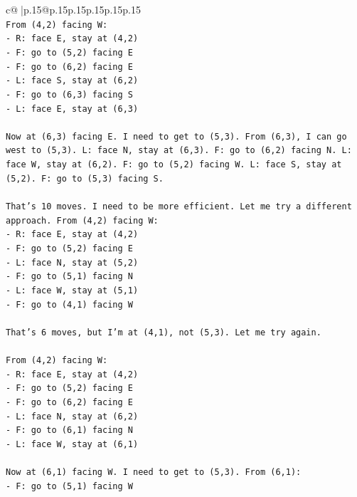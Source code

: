 \documentclass{article}
\begin{document}
{\begin{supertabular}{c@{$\;$}|p{.15\linewidth}@{}p{.15\linewidth}p{.15\linewidth}p{.15\linewidth}p{.15\linewidth}p{.15\linewidth}}
{{{\\ 
\texttt{From (4,2) facing W:} \\
\texttt{{-} R: face E, stay at (4,2)} \\
\texttt{{-} F: go to (5,2) facing E} \\
\texttt{{-} F: go to (6,2) facing E} \\
\texttt{{-} L: face S, stay at (6,2)} \\
\texttt{{-} F: go to (6,3) facing S} \\
\texttt{{-} L: face E, stay at (6,3)} \\
\\ 
\texttt{Now at (6,3) facing E. I need to get to (5,3). From (6,3), I can go west to (5,3). L: face N, stay at (6,3). F: go to (6,2) facing N. L: face W, stay at (6,2). F: go to (5,2) facing W. L: face S, stay at (5,2). F: go to (5,3) facing S.} \\
\\ 
\texttt{That's 10 moves. I need to be more efficient. Let me try a different approach. From (4,2) facing W:} \\
\texttt{{-} R: face E, stay at (4,2)} \\
\texttt{{-} F: go to (5,2) facing E} \\
\texttt{{-} L: face N, stay at (5,2)} \\
\texttt{{-} F: go to (5,1) facing N} \\
\texttt{{-} L: face W, stay at (5,1)} \\
\texttt{{-} F: go to (4,1) facing W} \\
\\ 
\texttt{That's 6 moves, but I'm at (4,1), not (5,3). Let me try again.} \\
\\ 
\texttt{From (4,2) facing W:} \\
\texttt{{-} R: face E, stay at (4,2)} \\
\texttt{{-} F: go to (5,2) facing E} \\
\texttt{{-} F: go to (6,2) facing E} \\
\texttt{{-} L: face N, stay at (6,2)} \\
\texttt{{-} F: go to (6,1) facing N} \\
\texttt{{-} L: face W, stay at (6,1)} \\
\\ 
\texttt{Now at (6,1) facing W. I need to get to (5,3). From (6,1):} \\
\texttt{{-} F: go to (5,1) facing W} \\
}}}
\end{supertabular}}
\end{document}
